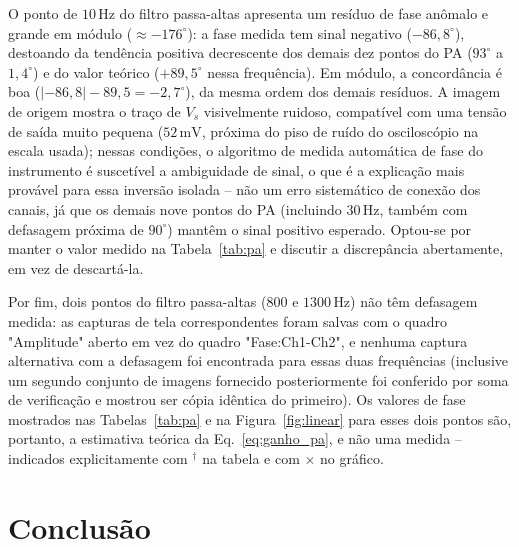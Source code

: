 \documentclass[reprint,amsmath,amssymb,aps,prl,floatfix,onecolumn]{revtex4-2}
\begin{document}
O ponto de $10\,\text{Hz}$ do filtro passa-altas apresenta um resíduo de fase anômalo e grande em módulo ($\approx-176^\circ$): a fase medida tem sinal negativo ($-86{,}8^\circ$), destoando da tendência positiva decrescente dos demais dez pontos do PA ($93^\circ$ a $1{,}4^\circ$) e do valor teórico ($+89{,}5^\circ$ nessa frequência). Em módulo, a concordância é boa ($|{-86{,}8}|-89{,}5=-2{,}7^\circ$), da mesma ordem dos demais resíduos. A imagem de origem mostra o traço de $V_s$ visivelmente ruidoso, compatível com uma tensão de saída muito pequena ($52\,\text{mV}$, próxima do piso de ruído do osciloscópio na escala usada); nessas condições, o algoritmo de medida automática de fase do instrumento é suscetível a ambiguidade de sinal, o que é a explicação mais provável para essa inversão isolada -- não um erro sistemático de conexão dos canais, já que os demais nove pontos do PA (incluindo $30\,\text{Hz}$, também com defasagem próxima de $90^\circ$) mantêm o sinal positivo esperado. Optou-se por manter o valor medido na Tabela~\ref{tab:pa} e discutir a discrepância abertamente, em vez de descartá-la.

Por fim, dois pontos do filtro passa-altas ($800$ e $1300\,\text{Hz}$) não têm defasagem medida: as capturas de tela correspondentes foram salvas com o quadro "Amplitude" aberto em vez do quadro "Fase:Ch1-Ch2", e nenhuma captura alternativa com a defasagem foi encontrada para essas duas frequências (inclusive um segundo conjunto de imagens fornecido posteriormente foi conferido por soma de verificação e mostrou ser cópia idêntica do primeiro). Os valores de fase mostrados nas Tabelas~\ref{tab:pa} e na Figura~\ref{fig:linear} para esses dois pontos são, portanto, a estimativa teórica da Eq.~\eqref{eq:ganho_pa}, e não uma medida -- indicados explicitamente com $^\dagger$ na tabela e com $\times$ no gráfico.

\section{Conclusão}
\end{document}
